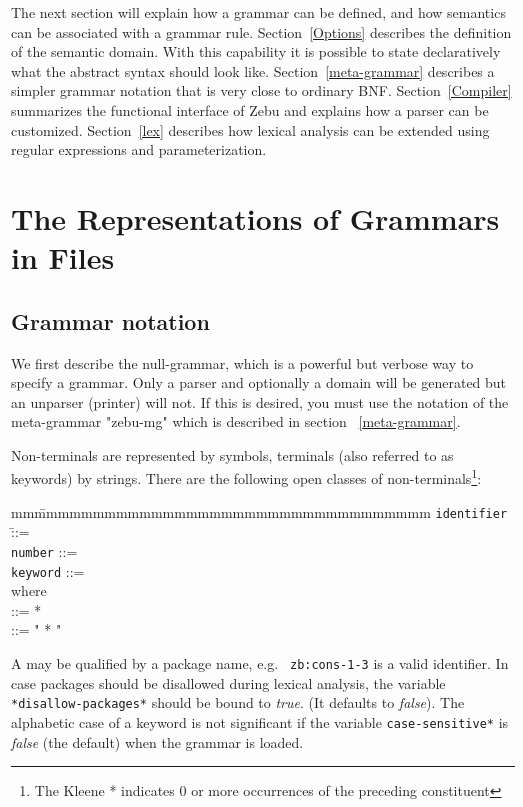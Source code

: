 The next section will explain how a grammar can be defined, and how
semantics can be associated with a grammar rule. Section~\ref{Options}
describes the definition of the semantic domain.  With this capability
it is possible to state declaratively what the abstract syntax should
look like. Section~\ref{meta-grammar} describes a simpler grammar
notation that is very close to ordinary BNF\@.  Section~\ref{Compiler}
summarizes the functional interface of Zebu and explains how a parser
can be customized.  Section~\ref{lex} describes how lexical analysis
can be extended using regular expressions and parameterization.


\section{The Representations of Grammars in Files}

\subsection{Grammar notation}

We first describe the null-grammar, which is a
powerful but verbose way to specify a grammar.  Only a parser and
optionally a domain will be generated but an unparser (printer) will
not.  If this is desired, you must use the notation of the
meta-grammar "zebu-mg" which is described in section
~\ref{meta-grammar}.

Non-terminals are represented by symbols,
terminals (also referred to as keywords) by strings.  There are the
following open classes of non-terminals\footnote{The Kleene *
indicates 0 or more occurrences of the preceding constituent}:

\begin{tabbing}
mm\=mmmmmmmmmmmmmmmmmmmmmmmmmmmmmmmmmm\kill
  \> {\tt identifier}  \= ::=  \\
  \> {\tt number}      \> ::=  \\
  \> {\tt keyword}     \> ::=  \\
where\\
  \>  \> ::= * \\
  \>   \> ::= " * "
\end{tabbing}

A  may be qualified by a package name, e.g. {\tt
zb:cons-1-3} is a valid identifier.  In case packages should be
disallowed during lexical analysis, the variable {\tt
*disallow-packages*}  should be bound to
{\em true}.  (It defaults to {\em false}).  The alphabetic case of a
keyword is not significant if the variable {\tt *case-sensitive*}
is {\em false} (the default) when the grammar is
loaded. 

